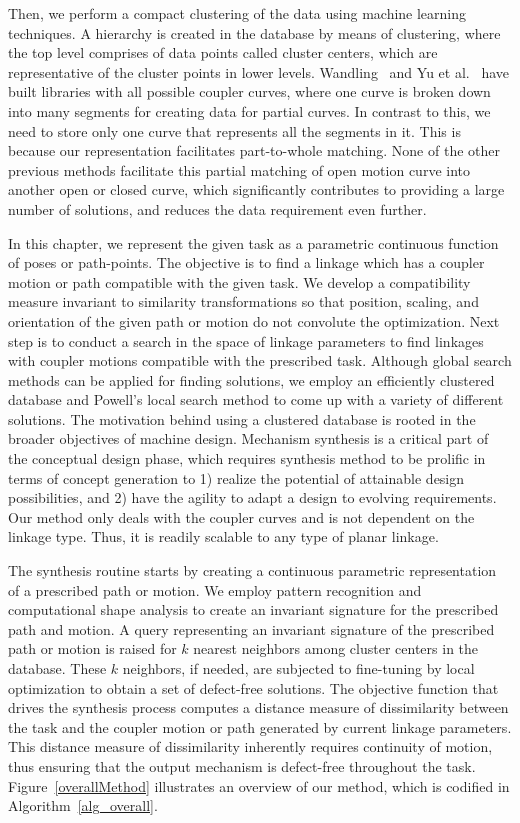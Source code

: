 Then, we perform a compact clustering of the data using machine learning techniques.
A hierarchy is created in the database by means of clustering, where the top level comprises of data points called cluster centers, which are representative of the cluster points in lower levels.
Wandling~\cite{wandling2000} and Yu et al.~\cite{yue-pathgen2011} have built libraries with all possible coupler curves, where one curve is broken down into many segments for creating data for partial curves.
In contrast to this, we need to store only one curve that represents all the segments in it.
This is because our representation facilitates part-to-whole matching.
None of the other previous methods facilitate this partial matching of open motion curve into another open or closed curve, which significantly contributes to providing a large number of solutions, and reduces the data requirement even further.

In this chapter, we represent the given task as a parametric continuous function of poses or path-points. The objective is to find a linkage which has a coupler motion or path compatible with the given task. We develop a compatibility measure invariant to similarity transformations so that position, scaling, and orientation of the given path or motion do not convolute the optimization.
Next step is to conduct a search in the space of linkage parameters to find linkages with coupler motions compatible with the prescribed task.
Although global search methods can be applied for finding solutions, we employ an efficiently clustered database and Powell's local search method to come up with a variety of different solutions.
The motivation behind using a clustered database is rooted in the broader objectives of machine design. Mechanism synthesis is a critical part of the conceptual design phase, which requires synthesis method to be prolific in terms of concept generation to 1) realize the potential of attainable design possibilities, and 2) have the agility to adapt a design to evolving requirements.
Our method only deals with the coupler curves and is not dependent on the linkage type.
Thus, it is readily scalable to any type of planar linkage.

The synthesis routine starts by creating a continuous parametric representation of a prescribed path or motion. We employ pattern recognition and computational shape analysis to create an invariant signature for the prescribed path and motion.
A query representing an invariant signature of the prescribed path or motion is raised for $k$ nearest neighbors among cluster centers in the database.
These $k$ neighbors, if needed, are subjected to fine-tuning by local optimization to obtain a set of defect-free solutions.
The objective function that drives the synthesis process computes a distance measure of dissimilarity between the task and the coupler motion or path generated by current linkage parameters.
This distance measure of dissimilarity inherently requires continuity of motion, thus ensuring that the output mechanism is defect-free throughout the task.
Figure~\ref{overallMethod} illustrates an overview of our method, which is codified in Algorithm~\ref{alg_overall}.

